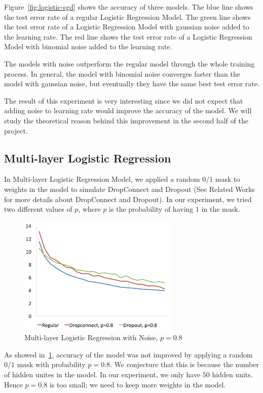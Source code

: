 Figure~\ref{fig:logistic-sgd} shows the accuracy of three models.
The blue line shows the test error rate of a regular Logistic Regression
Model.  The green line shows the test error rate of a Logistic Regression
Model with gaussian noise added to the learning rate.  The red line shows
the test error rate of a Logistic Regression Model with binomial noise
added to the learning rate.

The models with noise outperform the regular model through the whole
training process.  In general, the model with binomial noise converges
faster than the model
with gaussian noise, but eventually they have the same best test error
rate.

The result of this experiment is very interesting since we did not
expect that adding noise to learning rate would improve the accuracy
of the model. We will study the theoretical reason behind this improvement
in the second half of the project.

\subsection{Multi-layer Logistic Regression}
In Multi-layer Logistic Regression Model, we applied a random $0/1$ mask to
weights in the model to simulate DropConnect and Dropout
(See Related Works for more details about DropConnect and Dropout).
In our experiment, we tried two different values of $p$, where $p$ is
the probability of having $1$ in the mask.

\begin{figure}[h]
\centering
\includegraphics[width=215pt]{figs/mlp_psmall.png}
\caption{Multi-layer Logistic Regression with Noise, $p=0.8$}
\label{fig:mlp-noise-psmall}
\end{figure}

As showed in~\ref{fig:mlp-noise-psmall}, accuracy of the model was not
improved by applying a random $0/1$ mask with probability $p=0.8$.
We conjecture that this is because the number of hidden unites in the
model. In our experiment, we only have $50$ hidden units. Hence $p=0.8$ is
too small; we need to keep more weights in the model.

